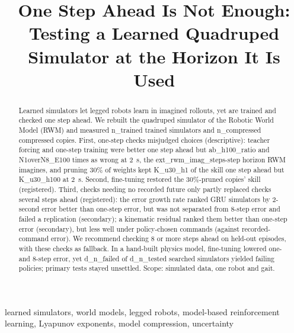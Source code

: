 \title{One Step Ahead Is Not Enough: Testing a Learned Quadruped Simulator at the Horizon It Is Used}
\author{\anonauthor}
\maketitle

\begin{abstract}
Learned simulators let legged robots learn in imagined rollouts, yet are trained and checked
one step ahead. We rebuilt the quadruped simulator of the Robotic World Model (RWM) and measured {{n_trained}}
trained simulators and {{n_compressed}} compressed copies. First, one-step checks misjudged choices
(descriptive): teacher forcing and one-step training were better one step ahead but {{ab_h100_ratio}} and
{{N1overN8_E100}} times as wrong at 2~s, the {{ext_rwm_imag_steps}}-step horizon RWM imagines, and pruning 30\% of
weights kept {{K_u30_h1}} of the skill one step ahead but {{K_u30_h100}} at 2~s. Second, fine-tuning restored the
30\%-pruned copies' skill (registered). Third, checks needing no recorded future only partly replaced checks several steps ahead
(registered): the error growth rate ranked GRU simulators by 2-second error better than one-step
error, but was not separated from 8-step error and failed a replication (secondary); a kinematic residual ranked them better than
one-step error (secondary), but less well under policy-chosen commands (against recorded-command error). We recommend checking 8 or more steps ahead on
held-out episodes, with these checks as fallback. In a hand-built physics model, fine-tuning lowered one- and 8-step
error, yet {{d_n_failed}} of {{d_n_tested}} searched simulators yielded failing policies; primary tests stayed unsettled. Scope: simulated data, one robot and gait.
\end{abstract}

\begin{IEEEkeywords}
learned simulators, world models, legged robots, model-based reinforcement learning, Lyapunov exponents,
model compression, uncertainty
\end{IEEEkeywords}

